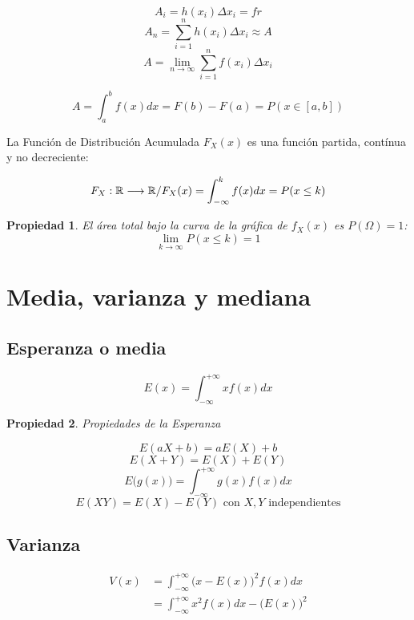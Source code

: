 \documentclass[a5paper,12pt,twoside]{book}
\newtheorem{prop}{{Propiedad}}[chapter]
\begin{document}
$$ A_i = h(x_i) \Delta x_i = fr $$
$$ A_n = \sum_{i=1}^n h(x_i) \Delta x_i \approx A $$
$$ A = \lim_{n \to \infty} \sum_{i=1}^n f(x_i) \Delta x_i $$

\begin{equation}
A = \int_a^b f(x) dx = F(b)-F(a) = P(x \in [a,b])
\end{equation}

La Función de Distribución Acumulada $F_X(x)$ es una función partida, contínua y no decreciente:

\begin{equation}
F_X: \mathbb{R} \longrightarrow \mathbb{R} / F_X(x) = \int_{-\infty}^k f(x) dx = P(x \leq k)
\end{equation}

\begin{prop}
El área total bajo la curva de la gráfica de $f_X(x)$ es $P(\Omega)=1$:
\begin{equation}
\lim_{k \to \infty} P(x \leq k)=1
\end{equation}
\end{prop}

\section{Media, varianza y mediana}

\subsection{Esperanza o media}

\begin{equation}
E(x)=\int_{-\infty}^{+\infty} x f(x) dx
\end{equation}

\begin{prop}
Propiedades de la Esperanza
\end{prop}

$$ E(aX+b)=aE(X)+b $$
$$ E(X+Y)=E(X)+E(Y) $$
$$ E\big(g(x)\big)=\int_{-\infty}^{+\infty} g(x) f(x) dx $$
$$ E(XY)=E(X)-E(Y) \text{ con } X,Y \textrm{ independientes} $$

\subsection{Varianza}

\begin{equation}
\begin{split}
V(x) &= \int_{-\infty}^{+\infty} \big(x-E(x)\big)^2 f(x) dx \\
&= \int_{-\infty}^{+\infty} x^2 f(x) dx -\big(E(x)\big)^2
\end{split}
\end{equation}
\end{document}
